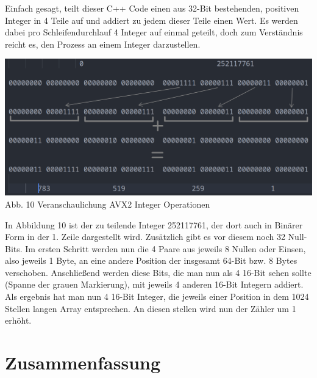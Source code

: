 \documentclass[12pt,a4paper]{article}
\begin{document}
Einfach gesagt, teilt dieser C++ Code einen aus 32-Bit bestehenden, positiven Integer in 4 Teile auf und addiert
zu jedem dieser Teile einen Wert. Es werden dabei pro Schleifendurchlauf 4 Integer auf einmal geteilt, doch zum Verständnis reicht es,
den Prozess an einem Integer darzustellen.

\begin{center}
    \includegraphics[width=1\textwidth]{./diagramme/matplotlib/avx2explanationfull.png}
    Abb. 10 Veranschaulichung AVX2 Integer Operationen
\end{center}

In Abbildung 10 ist der zu teilende Integer 252117761, der dort auch in Binärer Form in der 1. Zeile
dargestellt wird. Zusätzlich gibt es vor diesem noch 32 Null-Bits. Im ersten Schritt werden nun die 4
Paare aus jeweils 8 Nullen oder Einsen, also jeweils 1 Byte, an eine andere Position der insgesamt 64-Bit bzw. 8
Bytes verschoben. Anschließend werden diese Bits, die man nun als 4 16-Bit sehen sollte (Spanne der grauen Markierung),
mit jeweils 4 anderen 16-Bit Integern addiert. Als ergebnis hat man nun 4 16-Bit Integer, die
jeweils einer Position in dem 1024 Stellen langen Array entsprechen. An diesen stellen wird nun der Zähler
um 1 erhöht.

\clearpage
\section{Zusammenfassung}
\end{document}
